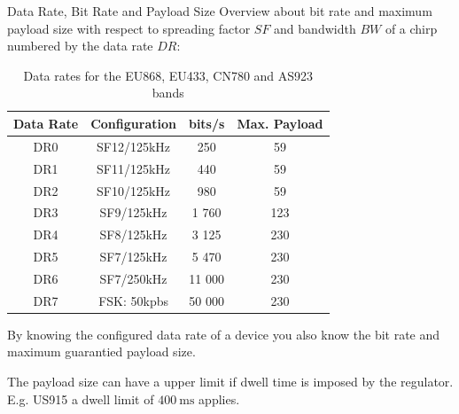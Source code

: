 \begin{frame}[t]{Data Rate, Bit Rate and Payload Size}
  Overview about \alert{bit rate} and \alert{maximum payload size} with respect to \alert{spreading factor} $SF$ and \alert{bandwidth} $BW$ of a chirp numbered by the \alert{data rate} $DR$:
  \begin{center}
    \begin{table}
      \begin{tabular}{c|c|c|c}
      \toprule
      Data Rate & Configuration & bits/s & Max. Payload \\
      \midrule
        DR0 & SF12/125kHz & 250 & 59\\
        DR1 & SF11/125kHz & 440 & 59\\
        DR2 & SF10/125kHz & 980 & 59\\
        DR3 & SF9/125kHz & 1 760 & 123\\
        DR4 & SF8/125kHz & 3 125 & 230\\
        DR5 & SF7/125kHz & 5 470 & 230\\
        DR6 & SF7/250kHz & 11 000 & 230\\
        DR7 & FSK: 50kpbs & 50 000 & 230
      \end{tabular}
    \caption{Data rates for the EU868, EU433, CN780 and AS923 bands}
    \end{table}%
  \end{center}%
  \vspace{-2mm}
  \begin{description}[$\Rightarrow$]
    \item[$\Rightarrow$] By knowing the configured \alert{data rate} of a device you also know the \alert{bit rate} and maximum \alert{guarantied payload size}.\\
    \item[$\Rightarrow$] The \alert{payload size} can have a \alert{upper limit} if \alert{dwell time} is imposed by the regulator. E.g. US915 a dwell limit of $\SI{400}{\milli\second}$ applies.
  \end{description}
\end{frame}
